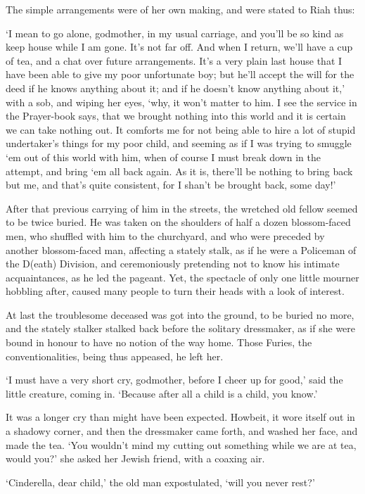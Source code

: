 The simple arrangements were of her own making, and were stated to Riah
thus:

‘I mean to go alone, godmother, in my usual carriage, and you’ll be so
kind as keep house while I am gone. It’s not far off. And when I return,
we’ll have a cup of tea, and a chat over future arrangements. It’s a
very plain last house that I have been able to give my poor unfortunate
boy; but he’ll accept the will for the deed if he knows anything about
it; and if he doesn’t know anything about it,’ with a sob, and wiping
her eyes, ‘why, it won’t matter to him. I see the service in the
Prayer-book says, that we brought nothing into this world and it is
certain we can take nothing out. It comforts me for not being able to
hire a lot of stupid undertaker’s things for my poor child, and seeming
as if I was trying to smuggle ‘em out of this world with him, when of
course I must break down in the attempt, and bring ‘em all back again.
As it is, there’ll be nothing to bring back but me, and that’s quite
consistent, for I shan’t be brought back, some day!’

After that previous carrying of him in the streets, the wretched old
fellow seemed to be twice buried. He was taken on the shoulders of half
a dozen blossom-faced men, who shuffled with him to the churchyard,
and who were preceded by another blossom-faced man, affecting a
stately stalk, as if he were a Policeman of the D(eath) Division, and
ceremoniously pretending not to know his intimate acquaintances, as he
led the pageant. Yet, the spectacle of only one little mourner hobbling
after, caused many people to turn their heads with a look of interest.

At last the troublesome deceased was got into the ground, to be buried
no more, and the stately stalker stalked back before the solitary
dressmaker, as if she were bound in honour to have no notion of the way
home. Those Furies, the conventionalities, being thus appeased, he left
her.

‘I must have a very short cry, godmother, before I cheer up for good,’
said the little creature, coming in. ‘Because after all a child is a
child, you know.’

It was a longer cry than might have been expected. Howbeit, it wore
itself out in a shadowy corner, and then the dressmaker came forth, and
washed her face, and made the tea. ‘You wouldn’t mind my cutting out
something while we are at tea, would you?’ she asked her Jewish friend,
with a coaxing air.

‘Cinderella, dear child,’ the old man expostulated, ‘will you never
rest?’

